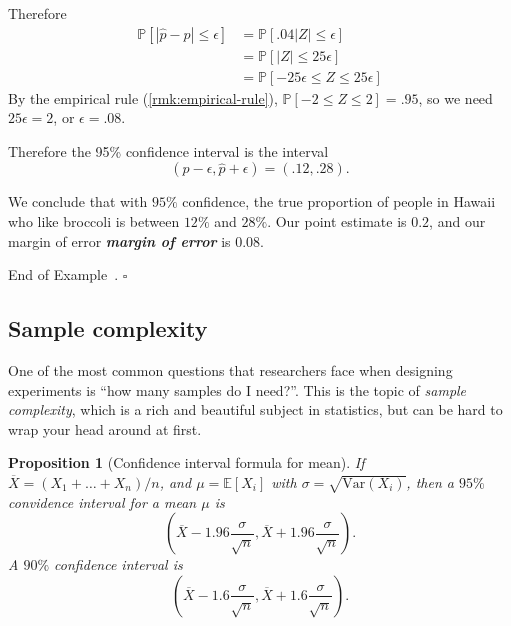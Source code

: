 \documentclass[10pt]{article}
\newtheorem{proposition}[theorem]{Proposition}
\theoremstyle{definition}
\newtheorem{example}[theorem]{Example}
\renewenvironment{example}
{\begin{oldexample}}
  {\par\smallskip\hfill   End of Example~\theexample. $\square$    \par\end{oldexample}}
\newcommand{\1}[1]{\textbf{1}_{\left[#1\right]}} %
\def\E{\mathbb{E}} %
\def\P{\mathbb{P}} %
\def\Var{\mathrm{Var}} %
\DeclareRobustCommand{\demph}[1]{%
  \ifmmode
  {\color{Blue}#1}%
  \else
  {\color{Blue}\bfseries\slshape #1}%
  \fi
}
\begin{document}
\begin{example}[Broccoli Poll]
  Therefore
  \begin{align*} 
    \P\left[|\widehat{p}-p| \leq \epsilon\right] 
    &= \P\left[.04|Z| \leq\epsilon \right] \\
    &= \P\left[|Z| \leq 25\epsilon\right]\\
    &= \P\left[-25\epsilon \leq Z \leq 25 \epsilon\right]
  \end{align*}
  By the empirical rule (\cref{rmk:empirical-rule}), $\P\left[-2 \leq Z \leq 2\right]=.95$, so we need
  $25\epsilon=2$, or $\epsilon= .08$.

  Therefore the 95\% confidence interval is the interval
  \begin{equation*}
    (\widehat{p}-\epsilon, \widehat{p}+\epsilon) = (.12,.28).
  \end{equation*}

  We conclude that with $95\%$ confidence, the true proportion of people in
  Hawaii who like broccoli is between $12\%$ and $28\%$. Our point estimate is
  $0.2$, and our \demph{margin of error} is $0.08$.

\end{example}

\subsection{Sample complexity}
One of the most common questions that researchers face when designing
experiments is ``how many samples do I need?''. This is the topic of
\textit{sample complexity}, which is a rich and beautiful subject in
statistics, but can be hard to wrap your head around at first. 

\begin{proposition}[Confidence interval formula for mean]
  \label{prop:confidence-interval-formula}
  If $\overline{X}=(X_{1}+\ldots+X_{n})/n$, and $\mu=\E[X_{i}]$ with
  $\sigma= \sqrt{\Var(X_{i})}$, then a $95\%$ convidence interval for a mean
  $\mu$ is
  \begin{equation*}
    \left( \overline{X}-1.96 \frac{\sigma}{\sqrt{n}}, \overline{X}+1.96 \frac{\sigma}{\sqrt{n}}\right).
  \end{equation*}
  A $90\%$ confidence interval is
  \begin{equation*}
    \left( \overline{X}-1.6 \frac{\sigma}{\sqrt{n}}, \overline{X}+1.6 \frac{\sigma}{\sqrt{n}}\right).
  \end{equation*}
\end{proposition}
\end{document}
